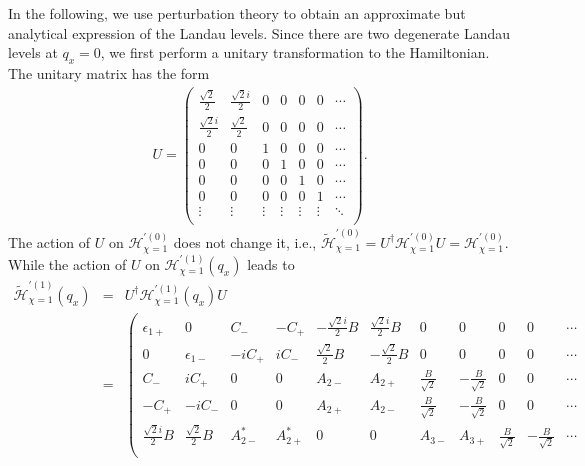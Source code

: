 \documentclass[aps,prl,twocolumn,longbibliography]{revtex4-1}
\begin{document}
\begin{widetext}
In the following, we use  perturbation theory to obtain an approximate but analytical expression of the Landau levels.
Since there are two degenerate Landau levels at $q_{x}=0$, we first perform a unitary transformation
to the Hamiltonian. The unitary matrix has the form
\begin{eqnarray}
U=\left(
    \begin{array}{ccccccc}
      \frac{\sqrt{2}}{2} & \frac{\sqrt{2}i}{2} & 0 & 0 & 0 & 0 & \cdots \\
      \frac{\sqrt{2}i}{2} & \frac{\sqrt{2}}{2} & 0 & 0 & 0 & 0 & \cdots \\
      0 & 0 & 1 & 0 & 0 & 0 & \cdots \\
      0 & 0 & 0 & 1 & 0 & 0 & \cdots \\
      0 & 0 & 0 & 0 & 1 & 0 & \cdots \\
      0 & 0 & 0 & 0 & 0 & 1 & \cdots \\
      \vdots & \vdots & \vdots & \vdots & \vdots & \vdots & \ddots \\
    \end{array}
  \right).
\end{eqnarray}
The action of $U$ on $\mathcal{H}_{\chi=1}^{'(0)}$ does not change it, i.e.,
$\tilde{\mathcal{H}}_{\chi=1}^{'(0)}=U^{\dag}\mathcal{H}_{\chi=1}^{'(0)}U=\mathcal{H}_{\chi=1}^{'(0)}$.
While the action of  $U$ on $\mathcal{H}_{\chi=1}^{'(1)}(q_{x})$ leads to
\begin{eqnarray}
\tilde{\mathcal{H}}_{\chi=1}^{'(1)}(q_{x})&=&U^{\dag}\mathcal{H}_{\chi=1}^{'(1)}(q_{x})U\nonumber\\
&=&\left(
                                     \begin{array}{ccccccccccc}
                                       \epsilon_{1+} & 0 & C_{-} & -C_{+} & -\frac{\sqrt{2}i}{2}B & \frac{\sqrt{2}i}{2}B & 0 & 0 & 0 & 0 & \cdots \\
                                       0 & \epsilon_{1-} & -iC_{+} & iC_{-} & \frac{\sqrt{2}}{2}B & -\frac{\sqrt{2}}{2}B & 0 & 0 & 0 & 0 & \cdots \\
                                       C_{-} & iC_{+} & 0 & 0 & A_{2-} & A_{2+} & \frac{B}{\sqrt{2}} & -\frac{B}{\sqrt{2}} & 0 & 0 & \cdots \\
                                       -C_{+} & -iC_{-} & 0 & 0 & A_{2+} & A_{2-} & \frac{B}{\sqrt{2}} & -\frac{B}{\sqrt{2}} & 0 & 0 & \cdots \\
                                       \frac{\sqrt{2}i}{2}B & \frac{\sqrt{2}}{2}B & A_{2-}^{*} & A_{2+}^{*} & 0 & 0 & A_{3-} & A_{3+} & \frac{B}{\sqrt{2}} & -\frac{B}{\sqrt{2}} & \cdots \\

\end{array}
\end{eqnarray}
\end{widetext}
\end{document}
